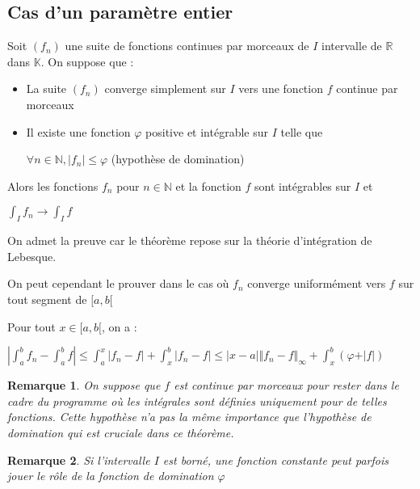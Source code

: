 \documentclass[a4paper,12pt]{book}
\newcommand{\Thr}[2]{\begin{tcolorbox}[sharp corners, colback=white,colframe=red!90!black!75, title=Théorème : #1]#2\end{tcolorbox}}
\newcommand{\Pre}[1]{\begin{tcolorbox}[sharp corners, colback=white,colframe=green!60!green!30!black!75, title=Preuve]#1\end{tcolorbox}}
\newtheorem{Rem}{Remarque}[section]
\def\R{\mathbb{R}}
\def\N{\mathbb{N}}
\def\K{\mathbb{K}}
\begin{document}
\subsection{Cas d'un paramètre entier}
\Thr{de convergence dominée}{Soit $(f_n)$ une suite de fonctions continues par morceaux de $I$ intervalle de $\R$ dans $\K$. On suppose que :\begin{itemize}
\item La suite $(f_n)$ converge simplement sur $I$ vers une fonction $f$ continue par morceaux
\item Il existe une fonction $\varphi$ positive et intégrable sur $I$ telle que \par\begin{center}$\forall n\in\N, \vert f_n\vert\leq\varphi$ (hypothèse de domination)\end{center}
\end{itemize}
Alors les fonctions $f_n$ pour $n\in\N$ et la fonction $f$ sont intégrables sur $I$ et \par\begin{center}$\int_If_n\to\int_If$\end{center}}
\Pre{On admet la preuve car le théorème repose sur la théorie d'intégration de Lebesque. \par On peut cependant le prouver dans le cas où $f_n$ converge uniformément vers $f$ sur tout segment de $[a,b[$ \par Pour tout $x\in[a,b[$, on a :\par $\left\vert\int_a^bf_n -\int_a^bf\right\vert\leq \int_a^x\vert f_n-f\vert + \int_x^b\vert f_n-f\vert\leq \vert x-a\vert\Vert f_n-f\Vert_\infty +\int_x^b(\varphi+\vert f\vert)$}
\begin{Rem}
On suppose que $f$ est continue par morceaux pour rester dans le cadre du programme où les intégrales sont définies uniquement pour de telles fonctions. Cette hypothèse n'a pas la même importance que l'hypothèse de domination qui est cruciale dans ce théorème.
\end{Rem}
\begin{Rem}
Si l'intervalle $I$ est borné, une fonction constante peut parfois jouer le rôle de la fonction de domination $\varphi$
\end{Rem}
\end{document}
